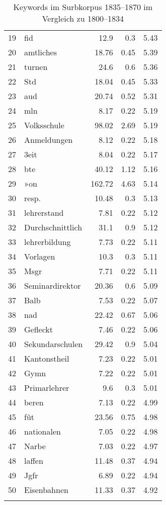 \begin{longtable}{llrrr}
            19 & fid & 12.9 & 0.3 & 5.43 \\ 
            20 & amtliches & 18.76 & 0.45 & 5.39 \\ 
            21 & turnen & 24.6 & 0.6 & 5.36 \\ 
            22 & Std & 18.04 & 0.45 & 5.33 \\ 
            23 & aud & 20.74 & 0.52 & 5.31 \\ 
            24 & mln & 8.17 & 0.22 & 5.19 \\ 
            25 & Volksschule & 98.02 & 2.69 & 5.19 \\ 
            26 & Anmeldungen & 8.12 & 0.22 & 5.18 \\ 
            27 & 3eit & 8.04 & 0.22 & 5.17 \\ 
            28 & bte & 40.12 & 1.12 & 5.16 \\ 
            29 & »on & 162.72 & 4.63 & 5.14 \\ 
            30 & resp. & 10.48 & 0.3 & 5.13 \\ 
            31 & lehrerstand & 7.81 & 0.22 & 5.12 \\ 
            32 & Durchschnittlich & 31.1 & 0.9 & 5.12 \\ 
            33 & lehrerbildung & 7.73 & 0.22 & 5.11 \\ 
            34 & Vorlagen & 10.3 & 0.3 & 5.11 \\ 
            35 & Msgr & 7.71 & 0.22 & 5.11 \\ 
            36 & Seminardirektor & 20.36 & 0.6 & 5.09 \\ 
            37 & Balb & 7.53 & 0.22 & 5.07 \\ 
            38 & nad & 22.42 & 0.67 & 5.06 \\ 
            39 & Gefleckt & 7.46 & 0.22 & 5.06 \\ 
            40 & Sekundarschulen & 29.42 & 0.9 & 5.04 \\ 
            41 & Kantonstheil & 7.23 & 0.22 & 5.01 \\ 
            42 & Gymn & 7.22 & 0.22 & 5.01 \\ 
            43 & Primarlehrer & 9.6 & 0.3 & 5.01 \\ 
            44 & beren & 7.13 & 0.22 & 4.99 \\ 
            45 & fût & 23.56 & 0.75 & 4.98 \\ 
            46 & nationalen & 7.05 & 0.22 & 4.98 \\ 
            47 & Narbe & 7.03 & 0.22 & 4.97 \\ 
            48 & laffen & 11.48 & 0.37 & 4.94 \\ 
            49 & Jgfr & 6.89 & 0.22 & 4.94 \\ 
            50 & Eisenbahnen & 11.33 & 0.37 & 4.92 \\ 
            \bottomrule
        \caption{Keywords im Surbkorpus 1835–1870 im Vergleich zu 1800–1834}
       \label{table:4-2}
    \end{longtable}


